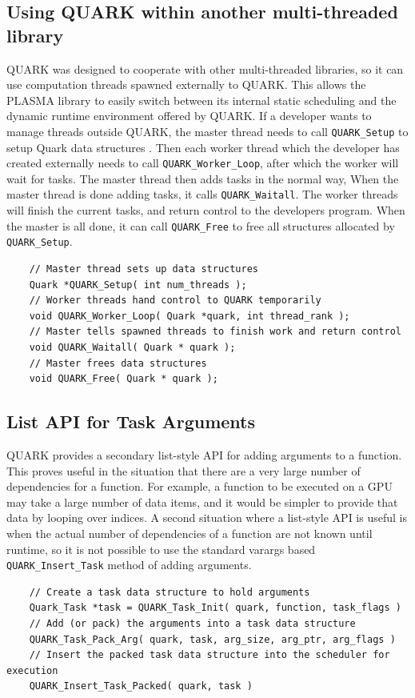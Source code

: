 \documentclass[11pt,letterpaper]{report}
\begin{document}
\subsection{Using QUARK within another multi-threaded library}
QUARK was designed to cooperate with other multi-threaded libraries,
so it can use computation threads spawned externally to QUARK.  This
allows the PLASMA library to easily switch between its internal static
scheduling and the dynamic runtime environment offered by QUARK.  If a
developer wants to manage threads outside QUARK, the master thread
needs to call \verb|QUARK_Setup| to setup Quark data structures .
Then each worker thread which the developer has created externally
needs to call \verb|QUARK_Worker_Loop|, after which the worker will
wait for tasks.  The master thread then adds tasks in the normal way,
When the master thread is done adding tasks, it calls
\verb|QUARK_Waitall|.  The worker threads will finish the current
tasks, and return control to the developers program.  When the master
is all done, it can call \verb|QUARK_Free| to free all structures
allocated by \verb|QUARK_Setup|.
\begin{samepage}
\begin{lstlisting}
    // Master thread sets up data structures
    Quark *QUARK_Setup( int num_threads );
    // Worker threads hand control to QUARK temporarily
    void QUARK_Worker_Loop( Quark *quark, int thread_rank );
    // Master tells spawned threads to finish work and return control
    void QUARK_Waitall( Quark * quark );
    // Master frees data structures
    void QUARK_Free( Quark * quark );
\end{lstlisting}
\end{samepage}

\subsection{List API for Task Arguments}
QUARK provides a secondary list-style API for adding arguments to a
function.  This proves useful in the situation that there are a very
large number of dependencies for a function.  For example, a function
to be executed on a GPU may take a large number of data items, and it
would be simpler to provide that data by looping over
indices\cite{Kurzak:2010:An-Implementation-of-the-Tile}.  A second
situation where a list-style API is useful is when the actual number
of dependencies of a function are not known until runtime, so it is
not possible to use the standard varargs based
\verb|QUARK_Insert_Task| method of adding arguments.
\begin{samepage}
\begin{lstlisting}
    // Create a task data structure to hold arguments
    Quark_Task *task = QUARK_Task_Init( quark, function, task_flags )
    // Add (or pack) the arguments into a task data structure
    QUARK_Task_Pack_Arg( quark, task, arg_size, arg_ptr, arg_flags )
    // Insert the packed task data structure into the scheduler for execution
    QUARK_Insert_Task_Packed( quark, task )
\end{lstlisting}
\end{samepage}
\end{document}
